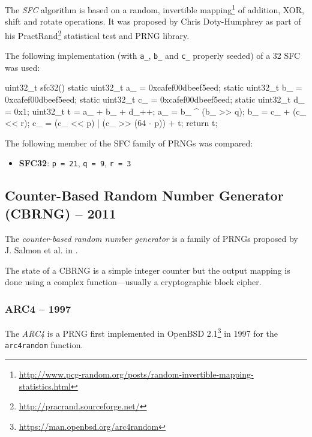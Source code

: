     The \emph{SFC} algorithm is based on a random, invertible mapping\footnote{\url{http://www.pcg-random.org/posts/random-invertible-mapping-statistics.html}} of addition, XOR, shift and rotate operations. It was proposed by Chris Doty-Humphrey as part of his PractRand\footnote{\url{http://pracrand.sourceforge.net/}} statistical test and PRNG library.

    The following implementation (with \lstinline|a_|, \lstinline|b_| and \lstinline|c_| properly seeded) of a \SI{32}{\bit} SFC was used:
\begin{@empty}
    \lstset{
        language = [ISO]C++
    }
\begin{centeredshadowboxlisting}
uint32_t sfc32() {
    static uint32_t a_ = 0xcafef00dbeef5eed;
    static uint32_t b_ = 0xcafef00dbeef5eed;
    static uint32_t c_ = 0xcafef00dbeef5eed;
    static uint32_t d_ = 0x1;
    uint32_t t = a_ + b_ + d_++;
    a_ = b_ ^ (b_ >> q);
    b_ = c_ + (c_ << r);
    c_ = (c_ << p) | (c_ >> (64 - p)) + t;
    return t;
}
\end{centeredshadowboxlisting}
\end{@empty}

    The following member of the SFC family of PRNGs was compared:
    \begin{itemize}
        \itemsep0em
        \item \textbf{SFC32}: \lstinline|p = 21|, \lstinline|q = 9|, \lstinline|r = 3|
    \end{itemize}

\subsection[Counter-Based Random Number Generator (CBRNG) -- 2011]{Counter-Based Random Number Generator (CBRNG) -- 2011} \label{subsec:cbrng}

    The \emph{counter-based random number generator} is a family of PRNGs proposed by J. Salmon et al. in \cite{Salmon:2011}.

    The state of a CBRNG is a simple integer counter but the output mapping is done using a complex function---usually a cryptographic block cipher.

\subsubsection[ARC4 -- 1997]{ARC4 -- 1997} \label{subsubsec:arc4}

    The \emph{ARC4} is a PRNG first implemented in OpenBSD 2.1\footnote{\url{https://man.openbsd.org/arc4random}} in 1997 for the \lstinline|arc4random| function.

